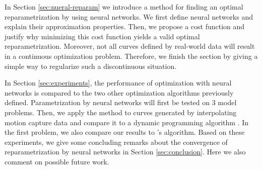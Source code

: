 In Section \ref{sec:nueral-reparam} we introduce a method for finding an optimal reparametrization by using neural networks. We first define neural networks and explain their approximation properties. Then, we propose a cost function and justify why minimizing this cost function yields a valid optimal reparametrization. Moreover, not all curves defined by real-world data will result in a continuous optimization problem. Therefore, we finish the section by giving a simple way to regularize such a discontinuous situation.

In Section \ref{sec:experiments}, the performance of optimization with neural networks is compared to the two other optimization algorithms previously defined. Parametrization by neural networks will first be tested on 3 model problems. Then, we apply the method to curves generated by interpolating motion capture data and compare it to a dynamic programming algorithm \cite{bauer2017dp}. In the first problem, we also compare our results to \citeauthor{jørgen2021}'s algorithm. Based on these experiments, we give some concluding remarks about the convergence of reparametrization by neural networks in Section \ref{sec:conclusion}. Here we also comment on possible future work.
